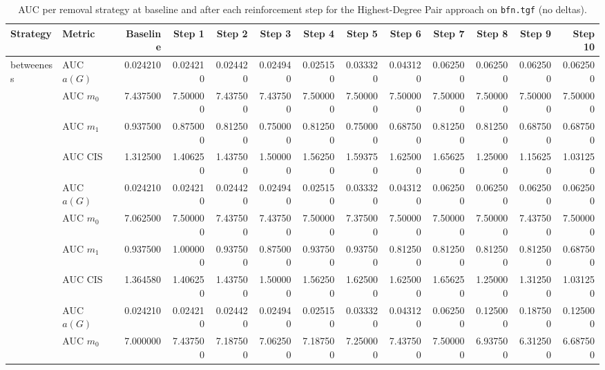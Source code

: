 \begin{table}[htbp]
  \centering
  \caption{AUC per removal strategy at baseline and after each reinforcement step for the Highest-Degree Pair approach on \texttt{bfn.tgf} (no deltas).}
  \label{tab:bfn-highest_degree_pair-auc}
\setlength{\tabcolsep}{2.5pt}
  \begin{tabular}{llrrrrrrrrrrr}
    \toprule
    \textbf{Strategy} & \textbf{Metric} & \textbf{Baseline} & \textbf{Step 1} & \textbf{Step 2} & \textbf{Step 3} & \textbf{Step 4} & \textbf{Step 5} & \textbf{Step 6} & \textbf{Step 7} & \textbf{Step 8} & \textbf{Step 9} & \textbf{Step 10} \\
    \midrule
    \multirow{4}{*}{betweeness} & AUC $a(G)$ & 0.024210 & 0.024210 & 0.024420 & 0.024940 & 0.025150 & 0.033320 & 0.043120 & 0.062500 & 0.062500 & 0.062500 & 0.062500 \\
    & AUC $m_0$ & 7.437500 & 7.500000 & 7.437500 & 7.437500 & 7.500000 & 7.500000 & 7.500000 & 7.500000 & 7.500000 & 7.500000 & 7.500000 \\
    & AUC $m_1$ & 0.937500 & 0.875000 & 0.812500 & 0.750000 & 0.812500 & 0.750000 & 0.687500 & 0.812500 & 0.812500 & 0.687500 & 0.687500 \\
    & AUC CIS & 1.312500 & 1.406250 & 1.437500 & 1.500000 & 1.562500 & 1.593750 & 1.625000 & 1.656250 & 1.250000 & 1.156250 & 1.031250 \\
    \addlinespace
    \multirow{4}{*}{closeness} & AUC $a(G)$ & 0.024210 & 0.024210 & 0.024420 & 0.024940 & 0.025150 & 0.033320 & 0.043120 & 0.062500 & 0.062500 & 0.062500 & 0.062500 \\
    & AUC $m_0$ & 7.062500 & 7.500000 & 7.437500 & 7.437500 & 7.500000 & 7.375000 & 7.500000 & 7.500000 & 7.500000 & 7.437500 & 7.500000 \\
    & AUC $m_1$ & 0.937500 & 1.000000 & 0.937500 & 0.875000 & 0.937500 & 0.937500 & 0.812500 & 0.812500 & 0.812500 & 0.812500 & 0.687500 \\
    & AUC CIS & 1.364580 & 1.406250 & 1.437500 & 1.500000 & 1.562500 & 1.625000 & 1.625000 & 1.656250 & 1.250000 & 1.312500 & 1.031250 \\
    \addlinespace
    \multirow{4}{*}{core influence} & AUC $a(G)$ & 0.024210 & 0.024210 & 0.024420 & 0.024940 & 0.025150 & 0.033320 & 0.043120 & 0.062500 & 0.125000 & 0.187500 & 0.125000 \\
    & AUC $m_0$ & 7.000000 & 7.437500 & 7.187500 & 7.062500 & 7.187500 & 7.250000 & 7.437500 & 7.500000 & 6.937500 & 6.312500 & 6.687500 \\

\end{tabular}
\end{table}
